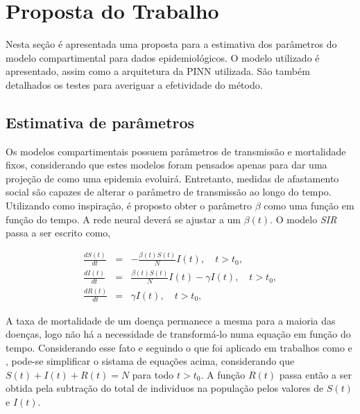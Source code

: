 \chapter{Proposta do Trabalho}
\label{sec-proposta}

Nesta seção é apresentada uma proposta para a estimativa dos parâmetros do 
modelo compartimental para dados epidemiológicos.
O modelo utilizado é apresentado, assim como a arquitetura da PINN utilizada.  
São também detalhados os testes para averiguar a efetividade do método.

\section{Estimativa de parâmetros}

Os modelos compartimentais possuem parâmetros de transmissão e mortalidade
fixos, considerando que estes modelos foram pensados apenas para dar 
uma projeção de como uma epidemia evoluirá. Entretanto, medidas de afastamento
social são capazes de alterar o parâmetro de transmissão ao longo do tempo.
Utilizando \cite{long-etal:21-L2} como inspiração, é proposto obter o parâmetro
$\beta$ como uma função em função do tempo. A rede neural deverá se ajustar 
a um $\beta(t)$. O modelo \textit{SIR} passa a ser escrito como, 

\begin{eqnarray}
   \frac{dS(t)}{dt} &=& -\frac{\beta(t) S(t)}{N} I(t),  \quad t > t_0, \label{eq:SIR-beta-t-1}\\
   \frac{dI(t)}{dt} &=& \frac{\beta(t) S(t)}{N} I(t) - \gamma I(t), \quad t > t_0, \label{eq:SIR-beta-t-2}\\
   \frac{dR(t)}{dt} &=& \gamma I(t),  \quad t > t_0, \label{eq:SIR-beta-t-3}
\end{eqnarray}

A taxa de mortalidade de um doença permanece a mesma para a maioria das doenças,
logo não há a necessidade de transformá-lo numa equação em função do tempo.
Considerando esse fato e seguindo o que foi aplicado em trabalhos como 
\cite{millevoi-etal:24-split-join-pinns} e \cite{ouyoussef-etal:24-subcompartimentos}, 
pode-se simplificar o sistama de equações acima, considerando que 
$S(t) + I(t) + R(t) = N$ para todo $t > t_0$.
A função $R(t)$ passa então a ser obtida pela subtração do total de individuos
na população pelos valores de $S(t)$ e $I(t)$.  

